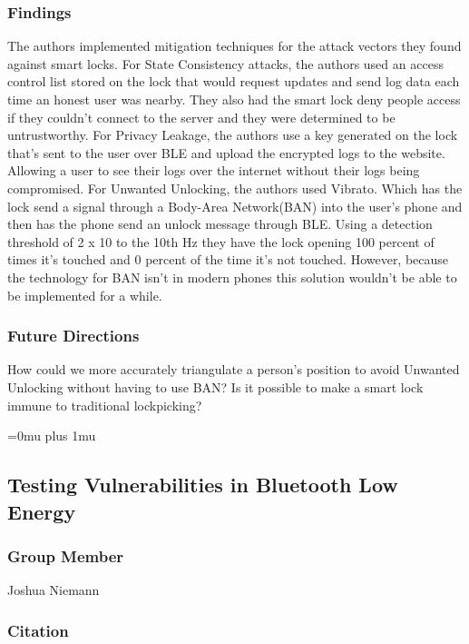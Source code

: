\subsubsection{Findings}

\noindent
The authors implemented mitigation techniques for the attack vectors they found against smart locks. For State Consistency attacks, the authors used an access control list stored on the lock that would request updates and send log data each time an honest user was nearby. They also had the smart lock deny people access if they couldn’t connect to the server and they were determined to be untrustworthy. For Privacy Leakage, the authors use a key generated on the lock that’s sent to the user over BLE and upload the encrypted logs to the website. Allowing a user to see their logs over the internet without their logs being compromised. For Unwanted Unlocking, the authors used Vibrato. Which has the lock send a signal through a Body-Area Network(BAN) into the user’s phone and then has the phone send an unlock message through BLE. Using a detection threshold of 2 x 10 to the 10th Hz they have the lock opening 100 percent of times it’s touched and 0 percent of the time it’s not touched. However, because the technology for BAN isn’t in modern phones this solution wouldn’t be able to be implemented for a while.

\subsubsection{Future Directions}

\noindent
How could we more accurately triangulate a person's position to avoid Unwanted Unlocking without having to use BAN? Is it possible to make a smart lock immune to traditional lockpicking?

\Urlmuskip=0mu plus 1mu\relax

\noindent
\subsection{Testing Vulnerabilities in Bluetooth Low Energy}

\subsubsection{Group Member}

\noindent
Joshua Niemann
\noindent
\subsubsection{Citation}

